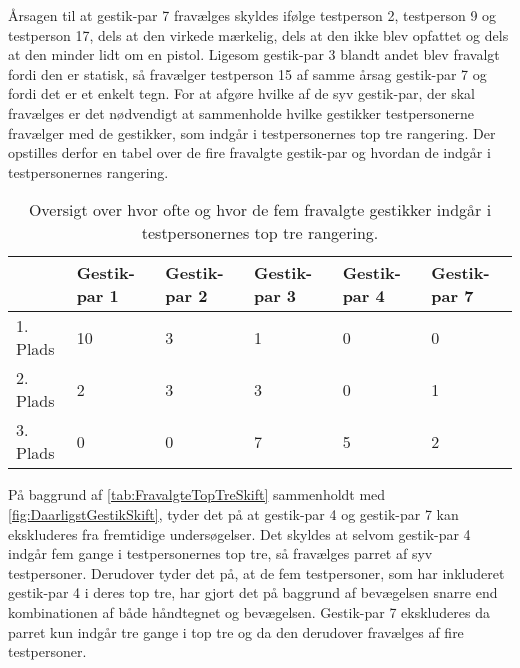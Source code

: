 Årsagen til at gestik-par 7 fravælges skyldes ifølge testperson 2, testperson 9 og testperson 17, dels at den virkede mærkelig, dels at den ikke blev opfattet og dels at den minder lidt om en pistol. Ligesom gestik-par 3 blandt andet blev fravalgt fordi den er statisk, så fravælger testperson 15 af samme årsag gestik-par 7 og fordi det er et enkelt tegn.\blankline
%
For at afgøre hvilke af de syv gestik-par, der skal fravælges er det nødvendigt at sammenholde hvilke gestikker testpersonerne fravælger med de gestikker, som indgår i testpersonernes top tre rangering. Der opstilles derfor en tabel over de fire fravalgte gestik-par og hvordan de indgår i testpersonernes rangering.    
%
\begin{table}[H]
	\centering
	\begin{tabular}{ | p{1.5cm} | p{2.1cm} | p{2.1cm} | p{2.1cm} | p{2.1cm} | p{2.1cm} |}
	\hline
		 & Gestik-par 1 & Gestik-par 2 & Gestik-par 3 & Gestik-par 4 & Gestik-par 7 \\ \hline
		1. Plads & 10 & 3 & 1 & 0 & 0\\ \hline
		2. Plads & 2 & 3 & 3 & 0 & 1\\ \hline
		3. Plads & 0 & 0 & 7 & 5 & 2\\ \hline
	\end{tabular}
	\caption{Oversigt over hvor ofte og hvor de fem fravalgte gestikker indgår i testpersonernes top tre rangering.}
	\label{tab:FravalgteTopTreSkift}
\end{table}
\noindent
%
På baggrund af \autoref{tab:FravalgteTopTreSkift} sammenholdt med \autoref{fig:DaarligstGestikSkift}, tyder det på at gestik-par 4 og gestik-par 7 kan ekskluderes fra fremtidige undersøgelser. Det skyldes at selvom gestik-par 4 indgår fem gange i testpersonernes top tre, så fravælges parret af syv testpersoner. Derudover tyder det på, at de fem testpersoner, som har inkluderet gestik-par 4 i deres top tre, har gjort det på baggrund af bevægelsen snarre end kombinationen af både håndtegnet og bevægelsen. Gestik-par 7 ekskluderes da parret kun indgår tre gange i top tre og da den derudover fravælges af fire testpersoner. 

